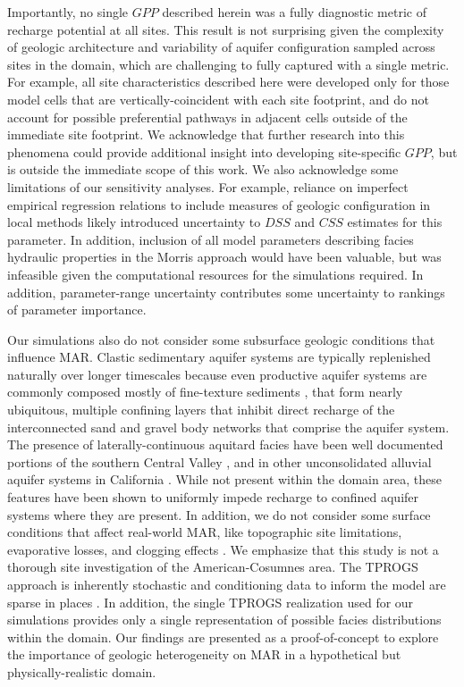 Importantly, no single $GPP$ described herein was a fully diagnostic metric of recharge potential at all sites. This result is not surprising given the complexity of geologic architecture and variability of aquifer configuration sampled across sites in the domain, which are challenging to fully captured with a single metric. For example, all site characteristics described here were developed only for those model cells that are vertically-coincident with each site footprint, and do not account for possible preferential pathways in adjacent cells outside of the immediate site footprint. We acknowledge that further research into this phenomena could provide additional insight into developing site-specific $GPP$, but is outside the immediate scope of this work. We also acknowledge some limitations of our sensitivity analyses. For example, reliance on imperfect empirical regression relations to include measures of geologic configuration in local methods likely introduced uncertainty to $DSS$ and $CSS$ estimates for this parameter. In addition, inclusion of all model parameters describing facies hydraulic properties in the Morris approach would have been valuable, but was infeasible given the computational resources for the simulations required. In addition, parameter-range uncertainty contributes some uncertainty to rankings of parameter importance. 

Our simulations also do not consider some subsurface geologic conditions that influence MAR. Clastic sedimentary aquifer systems are typically replenished naturally over longer timescales \citep{taylor2013ground} because even productive aquifer systems are commonly composed mostly of fine-texture sediments \citep[e.g.,][]{fogg1986groundwater,fogg2000connected}, that form nearly ubiquitous, multiple confining layers that inhibit direct recharge of the interconnected sand and gravel body networks that comprise the aquifer system. The presence of laterally-continuous aquitard facies have been well documented portions of the southern Central Valley \citep{phillips1991calibration,faunt2009groundwater}, and in other unconsolidated alluvial aquifer systems in California \cite[e.g.,][]{DWRcoachella}. While not present within the domain area, these features have been shown to uniformly impede recharge to confined aquifer systems where they are present. In addition, we do not consider some surface conditions that affect real-world MAR, like topographic site limitations, evaporative losses, and clogging effects \citep{bouwer2002artificial}. We emphasize that this study is not a thorough site investigation of the American-Cosumnes area. The TPROGS approach is inherently stochastic and conditioning data to inform the model are sparse in places \citep{maples_2019}. In addition, the single TPROGS realization used for our simulations provides only a single representation of possible facies distributions within the domain. Our findings are presented as a proof-of-concept to explore the importance of geologic heterogeneity on MAR in a hypothetical but physically-realistic domain.

